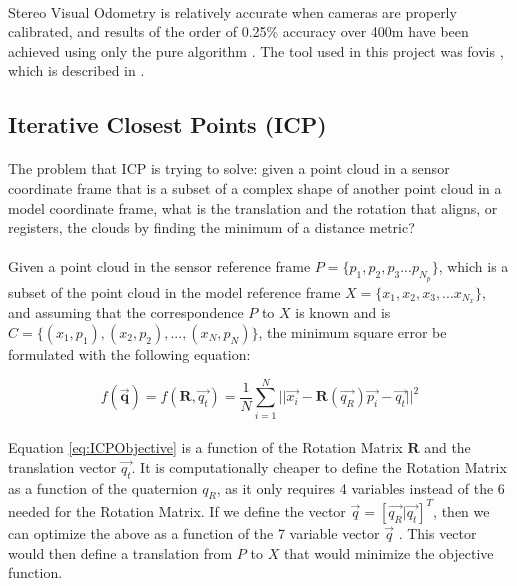 \documentclass[12pt]{article}
\begin{document}
	\paragraph{}
	Stereo Visual Odometry is relatively accurate when cameras are properly calibrated, and results of the order of 0.25\% accuracy over 400m have been achieved using only the pure algorithm \cite{StereoVis1}. The tool used in this project was fovis \cite{fovis}, which is described in \cite{VisualOdometry}.
	
	\subsection{Iterative Closest Points (ICP)}
	\paragraph{}
	The problem that ICP is trying to solve: given a point cloud in a sensor coordinate frame that is a subset of a complex shape of another point cloud in a model coordinate frame, what is the translation and the rotation that aligns, or registers, the clouds by finding the minimum of a distance metric?
	
	\paragraph{}
	Given a point cloud in the sensor reference frame $P = \{p_1, p_2, p_3 ... p_{N_p}\}$, which is a subset of the point cloud in the model reference frame $X = \{x_1, x_2, x_3, ... x_{N_x}\}$, and assuming that the correspondence $P$ to $X$ is known and is $C = \{(x_1,p_1), (x_2,p_2), ... , (x_N, p_N)\}$, the minimum square error be formulated with the following equation:
	
	\begin{equation}
	f(\mathbf{\overrightarrow{q}}) = f(\mathbf{R},\overrightarrow{q_t}) = \frac{1}{N}\sum_{i=1}^{N}{||\overrightarrow{x_i}-\mathbf{R}(\overrightarrow{q_R})\overrightarrow{p_i}-\overrightarrow{q_t}||^{2}} 	
	\label{eq:ICPObjective}
	\end{equation}		
	
	\paragraph{}
	Equation \ref{eq:ICPObjective} is a function of the Rotation Matrix $\mathbf{R}$ and the translation vector $\overrightarrow{q_t}$. It is computationally cheaper to define the Rotation Matrix as a function of the quaternion $q_R$, as it only requires 4 variables instead of the 6 needed for the Rotation Matrix. If we define the vector $\overrightarrow{q} = [\overrightarrow{q_R} | \overrightarrow{q_t}]^T$, then we can optimize the above as a function of the 7 variable vector $\overrightarrow{q}$ \cite{AMethodRegistration}. This vector would then define a translation from $P$ to $X$ that would minimize the objective function.
	
\end{document}
